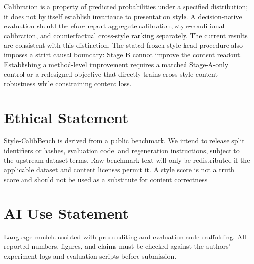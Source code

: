 \documentclass[letterpaper]{article} %
\begin{document}
Calibration is a property of predicted probabilities under a specified distribution; it does not by itself establish invariance to presentation style. A decision-native evaluation should therefore report aggregate calibration, style-conditional calibration, and counterfactual cross-style ranking separately. The current results are consistent with this distinction. The stated frozen-style-head procedure also imposes a strict causal boundary: Stage B cannot improve the content readout. Establishing a method-level improvement requires a matched Stage-A-only control or a redesigned objective that directly trains cross-style content robustness while constraining content loss.

\section*{Ethical Statement}

Style-CalibBench is derived from a public benchmark. We intend to release split identifiers or hashes, evaluation code, and regeneration instructions, subject to the upstream dataset terms. Raw benchmark text will only be redistributed if the applicable dataset and content licenses permit it. A style score is not a truth score and should not be used as a substitute for content correctness.

\section*{AI Use Statement}

Language models assisted with prose editing and evaluation-code scaffolding. All reported numbers, figures, and claims must be checked against the authors' experiment logs and evaluation scripts before submission.


\end{document}
